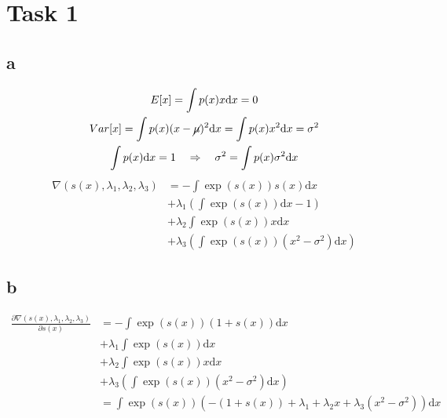 \section*{Task 1}

\subsection*{a}
\begin{gather*}
E[x] = \int p(x) x \mathrm{d}x = 0\\
Var[x] = \int p(x) (x - \cancel{\mu})^2 \mathrm{d}x =  \int p(x) x^2 \mathrm{d}x = \sigma^2\\
\int p(x)\mathrm{d}x = 1 \quad \Rightarrow \quad \sigma^2 = \int p(x) \sigma^2 \mathrm{d}x
\end{gather*}
\begin{align*}
\nabla(s(x), \lambda_1, \lambda_2, \lambda_3) & = - \int \exp(s(x))s(x) \mathrm{d}x \\
                                              &     + \lambda_1(\int \exp(s(x)) \mathrm{d}x - 1) \\
                                              &     + \lambda_2 \int \exp(s(x)) x \mathrm{d}x \\
                                              &     + \lambda_3 (\int \exp(s(x))(x^2 - \sigma^2) \mathrm{d}x)
\end{align*}

\subsection*{b}

\begin{align*}
    \frac{\partial \nabla(s(x), \lambda_1, \lambda_2, \lambda_3)}{\partial s(x)} & = - \int \exp(s(x))(1 + s(x)) \mathrm{d}x \\
                                                   & + \lambda_1 \int \exp(s(x)) \mathrm{d}x \\
                                                   & + \lambda_2 \int \exp(s(x)) x \mathrm{d}x \\
                                                   & + \lambda_3 (\int \exp(s(x))(x^2 - \sigma^2) \mathrm{d}x)\\
 & = \int \exp(s(x))\left(-(1 + s(x)) + \lambda_1 + \lambda_2 x + \lambda_3 (x^2 - \sigma^2) \right)\mathrm{d}x \\
\end{align*}

